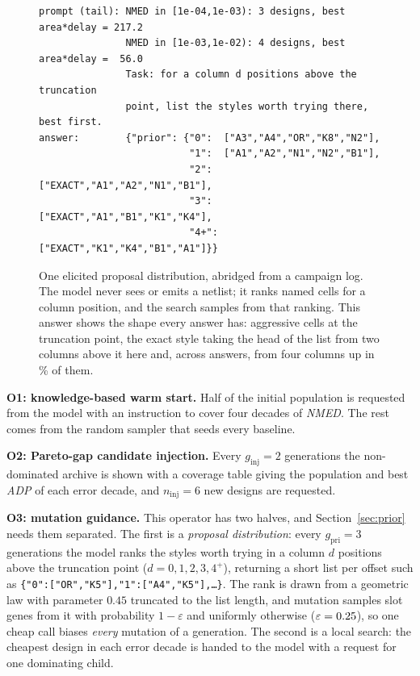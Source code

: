 \documentclass[acmsmall,review,anonymous]{acmart}
\newcommand{\nmed}{\textit{NMED}}
\newcommand{\adp}{\textit{ADP}}
\begin{document}
\begin{figure}[t]
\small
\begin{verbatim}
prompt (tail): NMED in [1e-04,1e-03): 3 designs, best area*delay = 217.2
               NMED in [1e-03,1e-02): 4 designs, best area*delay =  56.0
               Task: for a column d positions above the truncation
               point, list the styles worth trying there, best first.
answer:        {"prior": {"0":  ["A3","A4","OR","K8","N2"],
                          "1":  ["A1","A2","N1","N2","B1"],
                          "2":  ["EXACT","A1","A2","N1","B1"],
                          "3":  ["EXACT","A1","B1","K1","K4"],
                          "4+": ["EXACT","K1","K4","B1","A1"]}}
\end{verbatim}
\caption{One elicited proposal distribution, abridged from a campaign log.  The
model never sees or emits a netlist; it ranks named cells for a column
position, and the search samples from that ranking.  This answer shows the
shape every answer has: aggressive cells at the truncation point, the exact
style taking the head of the list from two columns above it here and, across
answers, from four columns up in \PriorExactFar\% of them.}
\label{fig:exchange}
\end{figure}

\textbf{O1: knowledge-based warm start.}  Half of the initial population is
requested from the model with an instruction to cover four decades of \nmed{}.
The rest comes from the random sampler that seeds every baseline.

\textbf{O2: Pareto-gap candidate injection.}  Every $g_{\mathrm{inj}}=2$
generations the non-dominated archive is shown with a coverage table giving the
population and best \adp{} of each error decade, and $n_{\mathrm{inj}}=6$ new
designs are requested.

\textbf{O3: mutation guidance.}  This operator has two halves, and
Section~\ref{sec:prior} needs them separated.  The first is a \emph{proposal
distribution}: every $g_{\mathrm{pri}}=3$ generations the model ranks the
styles worth trying in a column $d$ positions above the truncation point
($d=0,1,2,3,4^{+}$), returning a short list per offset such as
\texttt{\{"0":["OR","K5"],"1":["A4","K5"],\ldots\}}.  The rank is drawn from a
geometric law with parameter $0.45$ truncated to the list length, and mutation
samples slot genes from it with probability $1-\varepsilon$ and uniformly
otherwise ($\varepsilon=0.25$), so one cheap call biases \emph{every}
mutation of a generation.  The second is a local search: the cheapest design in
each error decade is handed to the model with a request for one dominating
child.
\end{document}
